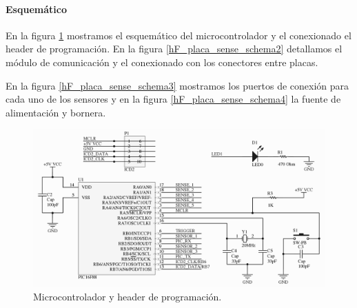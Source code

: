 \paragraph{Esquem\'atico}
\label{h_placas_sensado_esquematico}

En la figura \ref{hF_placa_sense_schema} mostramos el esquem\'atico del microcontrolador y el conexionado
el header de programaci\'on.
En la figura \ref{hF_placa_sense_schema2} detallamos el m\'odulo de comunicaci\'on y el conexionado con
los conectores entre placas.

En la figura \ref{hF_placa_sense_schema3} mostramos los puertos de conexi\'on para cada uno de los sensores
y en la figura \ref{hF_placa_sense_schema4} la fuente de alimentaci\'on y bornera.

\begin{figure}
	\centering
	\includegraphics[scale=.22]{figuras/sense_schemaMicro.png}
	\caption{Microcontrolador y header de programaci\'on.}
	\label{hF_placa_sense_schema}
\end{figure}

